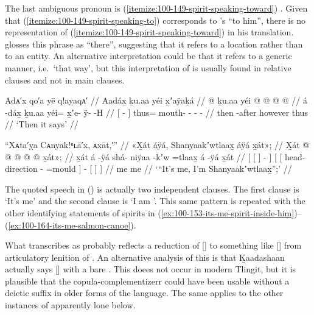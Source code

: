 The last ambiguous pronoun is (\ref{itemize:100-149-spirit-speaking-toward}) .
Given that (\ref{itemize:100-149-spirit-speaking-to})  corresponds to \citeauthor{swanton:1909}’s “to him”, there is no representation of (\ref{itemize:100-149-spirit-speaking-toward})  in his translation.
\citeauthor{swanton:1909} glosses this phrase as “there”, suggesting that it refers to a location rather than to an entity.
An alternative interpretation could be that it refers to a generic manner, i.e.\ ‘that way’, but this interpretation of  is usually found in relative clauses and not in main clauses.

\ex\label{ex:100-150-then-it-says}%
%
\begingl
	\glpreamble	Adᴀ′x qo′a yē q!aỵaqᴀ′ //
	\glpreamble	Aadáx̱ ḵu.aa yéi x̱ʼaÿaḵá //
	\gla	{}  @ {} {} ḵu.aa
		yéi @  @ {} @ {} @ {} //
	\glb	{} á -dáx̱ {} ḵu.aa
		yéi= x̱ʼe- ÿ-  -H //
	\glc	{}[  - {}] 
		thus= mouth- - -  - //
	\gld	{} then -after {} however
		thus  {} {} {} //
	\glft	‘Then it says’
		//
\endgl
\xe

\ex\label{ex:100-151-me-Shanyaakwtlaaxh}%
%
\begingl
	\glpreamble	“Xᴀta′ỵa Cᴀnyak!ᵘʟā′x, ᴀxāt,′” //
	\glpreamble	«\!X̱át áÿá, Shanyaakʼwtlaax̱ áÿá x̱át\!»; //
	\gla	{} {} X̱át {}  @ {} {}
		{} {}  @ {} @ {} @ {} {}
			 @ {} 
			{} x̱át\!»; {} {} //
	\glb	{} {} x̱át {} á -ÿá {}
		{} {} shá- niÿaa -kʼw =tlaax̱ {}
			á -ÿá
			{} x̱át {} {} //
	\glc	{}[ {}[  {}]  - {}]
		{}[ {}[ head- direction - =mould {}]
			 -
			{}[  {}] {}] //
	\gld	{} {} me {}  {} {}
		{} {}  {} {} {} {}
			 {} 
			{} me {} {} //
	\glft	‘“It’s me, I’m Shanyaakʼwtlaax̱”;’
		//
\endgl
\xe

The quoted speech in (\lastx) is actually two independent clauses.
The first clause is  ‘It’s me’ and the second clause is  ‘I am ’.
This same pattern is repeated with the other identifying statements of spirits in (\ref{ex:100-153-its-me-spirit-inside-him})–(\ref{ex:100-164-its-me-salmon-canoe}).

What \citeauthor{swanton:1909} transcribes as  probably reflects a reduction of  [] to something like [] from articulatory lenition of .
An alternative analysis of this is that Ḵaadashaan actually says  [] with a bare .
This doees not occur in modern Tlingit, but it is plausible that the copula-complementizerr  could have been usable without a deictic suffix in older forms of the language.
The same applies to the other instances of apparently lone  below.

